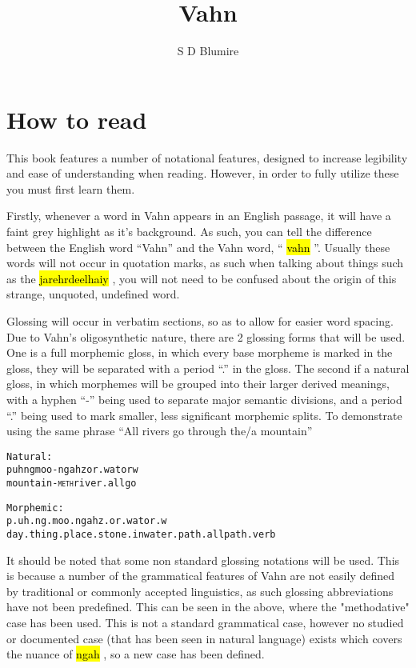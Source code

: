 \documentclass{article}
\title{Vahn}
\author{S D Blumire}
\newcommand{\hlv}[2][gray]{ {\sethlcolor{#1} \hl{#2}} }
\begin{document}
\maketitle
\thispagestyle{empty}
\newpage

\tableofcontents
\listoftables
\newpage

\section{How to read}

This book features a number of notational features, designed to increase legibility and ease of understanding when reading. However, in order to fully utilize these you must first learn them.

Firstly, whenever a word in Vahn appears in an English passage, it will have a faint grey highlight as it's background. As such, you can tell the difference between the English word ``Vahn'' and the Vahn word, ``\hlv{vahn}''. Usually these words will not occur in quotation marks, as such when talking about things such as the \hlv{jarehrdeelhaiy}, you will not need to be confused about the origin of this strange, unquoted, undefined word.

Glossing will occur in verbatim sections, so as to allow for easier word spacing. Due to Vahn's oligosynthetic nature, there are 2 glossing forms that will be used. One is a full morphemic gloss, in which every base morpheme is marked in the gloss, they will be separated with a period ``.'' in the gloss. The second if a natural gloss, in which morphemes will be grouped into their larger derived meanings, with a hyphen ``-'' being used to separate major semantic divisions, and a period ``.'' being used to mark smaller, less significant morphemic splits. To demonstrate using the same phrase ``All rivers go through the/a mountain''

\begin{alltt}
Natural:
puhngmoo-ngah zor.wa    torw
mountain-\textsc{meth} river.all go
\end{alltt}

\begin{alltt}
Morphemic:
p.uh.ng.moo.ngah         z.or.wa        tor.w
day.thing.place.stone.in water.path.all path.verb
\end{alltt}

It should be noted that some non standard glossing notations will be used. This is because a number of the grammatical features of Vahn are not easily defined by traditional or commonly accepted linguistics, as such glossing abbreviations have not been predefined. This can be seen in the above, where the "methodative" case has been used. This is not a standard grammatical case, however no studied or documented case (that has been seen in natural language) exists which covers the nuance of \hlv{ngah}, so a new case has been defined.
\end{document}

